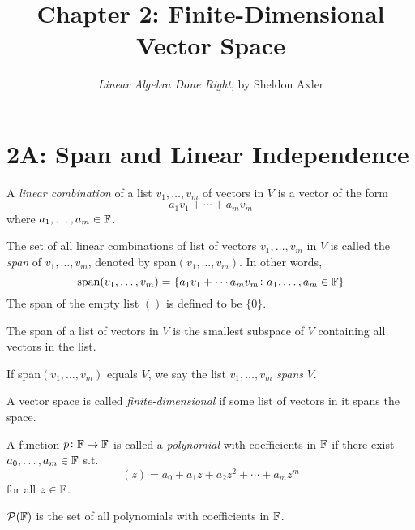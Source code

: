 \documentclass{extarticle}
\title{\vspace{-2em}Chapter 2: Finite-Dimensional Vector Space}
\author{\emph{Linear Algebra Done Right}, by Sheldon Axler}
\date{}
\begin{document}
\maketitle 
\tableofcontents
\newpage


\section*{2A: Span and Linear Independence}

\begin{definition}
    A \emph{linear combination} of a list \(v_1, \ldots, v_m\) of vectors in \(V\)
    is a vector of the form 
    \[a_1 v_1 + \cdots + a_m v_m\]
    where \(a_1, \ldots, a_m \in \mathbb{F}\).
\end{definition}

\begin{definition}[Span]
    The set of all linear combinations of list of vectors \(v_1, \ldots, v_m\) 
    in \(V\) is called the \emph{span} of \(v_1, \ldots, v_m\), denoted by 
    span\((v_1, \ldots, v_m)\). In other words, 
    \[\text{span}(v_1, \ldots, v_m) = \{a_1 v_1 + \cdots a_m v_m \colon a_1, \ldots, a_m \in \mathbb{F}\}\]
    The span of the empty list \(()\) is defined to be \(\{0\}\).
\end{definition}


\begin{thm}
    The span of a list of vectors in \(V\) is the smallest subspace of \(V\) 
    containing all vectors in the list.
\end{thm}

\begin{definition}[Spans]
    If span\((v_1, \ldots, v_m)\) equals \(V\), we say the list \(v_1, \ldots, v_m\)
    \emph{spans} \(V\). 
\end{definition}

\begin{definition}
    A vector space is called \emph{finite-dimensional} if some list of vectors 
    in it spans the space.
\end{definition}

\begin{definition}[polynomial]
    A function \(p \colon \mathbb{F} \to \mathbb{F}\) is called a \emph{polynomial} with coefficients
    in \(\mathbb{F}\) if there exist \(a_0, \ldots, a_m \in \mathbb{F}\) s.t. 
    \[(z) = a_0 + a_1 z + a_2 z^2 + \cdots + a_m z^m\]
    for all \(z \in \mathbb{F}\).

    \(\mathcal{P}(\mathbb{F})\) is the set of all polynomials with coefficients in \(\mathbb{F}\).
\end{definition}
\end{document}
